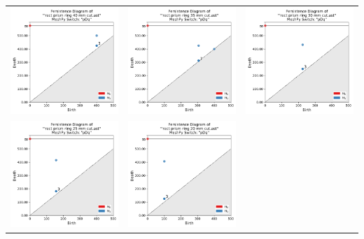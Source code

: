 \documentclass[ma]{uncgdissertationexp}
\theoremstyle{plain}
\theoremstyle{definition}
\theoremstyle{remark}
\begin{document}
\begin{table}[H]
\begin{center}
    \begin{tabular}{ccc}
         \includegraphics[width=1.875in]{Final Run, (rect prism ring 40 mm cut) persdia.png} &
         \includegraphics[width=1.875in]{Final Run, (rect prism ring 35 mm cut) persdia.png} &  
         \includegraphics[width=1.875in]{Final Run, (rect prism ring 30 mm cut) persdia.png} \\
         \includegraphics[width=1.875in]{Final Run, (rect prism ring 25 mm cut) persdia.png} & 
         \includegraphics[width=1.875in]{Final Run, (rect prism ring 20 mm cut) persdia.png} & 

\end{tabular}
\end{center}
\end{table}
\end{document}
